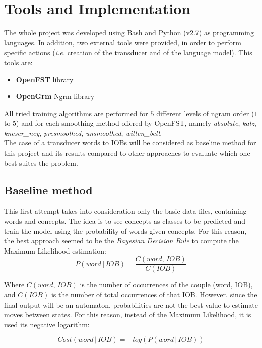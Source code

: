 \documentclass[11pt,a4paper]{article}
\begin{document}
\section{Tools and Implementation}

The whole project was developed using Bash and Python (v2.7) as programming languages. In addition, two external tools were provided, in order to perform specific actions (\textit{i.e.} creation of the transducer and of the language model). This tools are:
\begin{itemize}
	\item \textbf{OpenFST} library \cite{fst}
	\item \textbf{OpenGrm} Ngrm library \cite{ngr}
\end{itemize}

All tried training algorithms are performed for $5$ different levels of ngram order ($1$ to $5$) and for each smoothing method offered by OpenFST, namely \textit{absolute}, \textit{katz}, \textit{kneser\_ney}, \textit{presmoothed}, \textit{unsmoothed}, \textit{witten\_bell}.\\

The case of a transducer words to IOBs will be considered as baseline method for this project and its results compared to other approaches to evaluate which one best suites the problem.

\subsection{Baseline method}

This first attempt takes into consideration only the basic data files, containing words and concepts. The idea is to see concepts as classes to be predicted and train the model using the probability of words given concepts. For this reason, the best approach seemed to be the \textit{Bayesian Decision Rule} to compute the Maximum Likelihood estimation:
\begin{equation}
\label{probw2iob}
	P(word\,|\,IOB)=\frac{C(word,\,IOB)}{C(IOB)}
\end{equation}
	
	Where $C(word,\,IOB)$ is the number of occurrences of the couple (word, IOB), and $C(IOB)$ is the number of total occurrences of that IOB. However, since the final output will be an automaton, probabilities are not the best value to estimate moves between states. For this reason, instead of the Maximum Likelihood, it is used its negative logarithm:
	
	\[Cost(word\,|\,IOB)=-log(P(word\,|\,IOB)) \]
	
\end{document}
